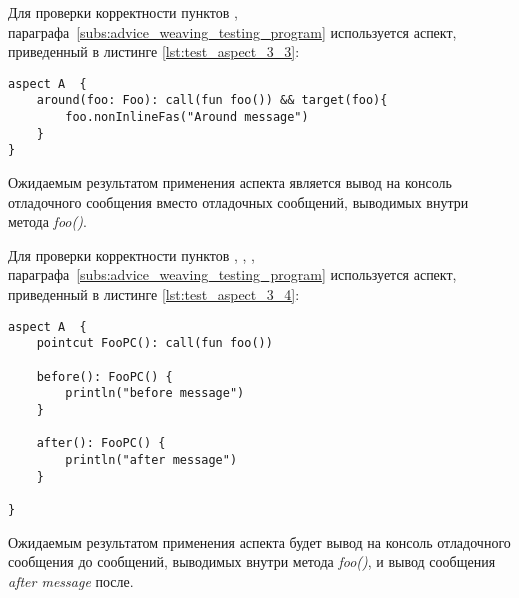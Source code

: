 Для проверки корректности пунктов \quotes{\ref{list:around_advice_weaving_check}},
\quotes{\ref{list:program_work_check}} параграфа~\ref{subs:advice_weaving_testing_program} используется аспект, приведенный в листинге \ref{lst:test_aspect_3_3}:
\begin{lstlisting}[style={java}, label={lst:test_aspect_3_3},
  caption={Пример тестового аспекта}]
aspect A  {
    around(foo: Foo): call(fun foo()) && target(foo){
        foo.nonInlineFas("Around message")
    }
}
\end{lstlisting}
Ожидаемым результатом применения аспекта является вывод на консоль отладочного сообщения  вместо отладочных сообщений, выводимых внутри метода \textit{foo()}.

Для проверки корректности пунктов \quotes{\ref{list:before_advice_weaving_check}},
\quotes{\ref{list:after_advice_weaving_check}},
\quotes{\ref{list:several_advices_weaving_check}},
\quotes{\ref{list:program_work_check}} параграфа~\ref{subs:advice_weaving_testing_program} используется аспект, приведенный в листинге \ref{lst:test_aspect_3_4}:
\begin{lstlisting}[style={java}, label={lst:test_aspect_3_4},
  caption={Пример тестового аспекта}]
aspect A  {
    pointcut FooPC(): call(fun foo())

    before(): FooPC() {
        println("before message")
    }

    after(): FooPC() {
        println("after message")
    }

}
\end{lstlisting}
Ожидаемым результатом применения аспекта будет вывод на консоль отладочного сообщения  до сообщений, выводимых внутри метода \textit{foo()}, и вывод сообщения \textit{after message} после.
